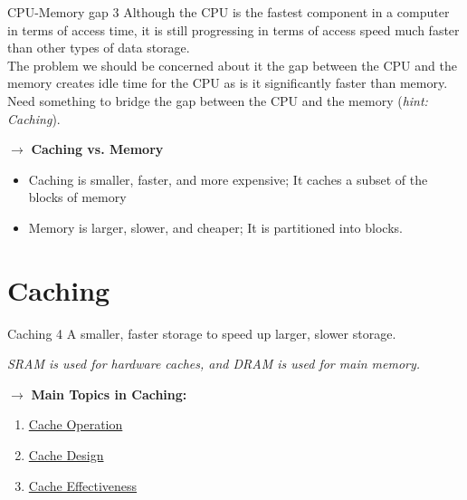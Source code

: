 \documentclass{report}
\begin{document}
\begin{definition} {CPU-Memory gap} { 3 }
  Although the CPU is the fastest component in a computer in terms of access time, it is still progressing in terms of access speed much faster than other types of data storage. \\
  
  The problem we should be concerned about it the gap between the CPU and the memory creates idle time for the CPU as is it significantly faster than memory. \\

  Need something to bridge the gap between the CPU and the memory (\emph{hint: Caching}).

\end{definition} 

$\to$ \textbf{Caching vs. Memory} 
\begin{itemize}
  \item Caching is smaller, faster, and more expensive; It caches a subset of the blocks of memory
  \item Memory is larger, slower, and cheaper; It is partitioned into blocks. 
\end{itemize}

\section{Caching}

\begin{definition} {Caching} { 4 }
  A smaller, faster storage to speed up larger, slower storage. \\
  \begin{note}
    \emph{SRAM is used for hardware caches, and DRAM is used for main memory.}
  \end{note} 
\end{definition}
  $\to$ \textbf{Main Topics in Caching: }
  \begin{enumerate}
    \item \underline{Cache Operation} 
    \item \underline{Cache Design} 
    \item \underline{Cache Effectiveness}  
  \end{enumerate}
\end{document}
